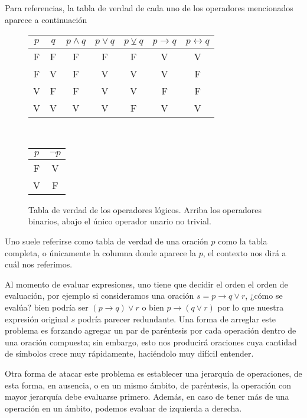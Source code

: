 \documentclass{book}
\theoremstyle{definition}
\begin{document}
Para referencias, la tabla de verdad de cada uno de los operadores mencionados aparece a continuación
\begin{figure}[h]
\begin{center}\begin{tabular}{|c|c||c|c|c|c|c|}
	\hline 
	$p$& $q$ & $p \wedge q $ & $p \vee q$  & $p \veebar q $ & $p \rightarrow q$ & $p \leftrightarrow q$  \\
	\hline \hline
	F & F & F & F & F & V & V \\
	\hline
	F & V & F & V & V & V & F \\
	\hline
	V & F & F & V & V & F & F \\
	\hline
	V & V & V & V & F & V & V \\
	\hline
\end{tabular}\\
\begin{tabular}{|c||c|}
	\hline
	$p$ & $\neg p$ \\
	\hline \hline
	F & V \\
	\hline
	V & F \\
	\hline
\end{tabular}
\end{center}
\caption{Tabla de verdad de los operadores lógicos. Arriba los operadores binarios, abajo el único operador unario no trivial.}
\label{tb_tablaVerdadOperadores}
\end{figure}

Uno suele referirse como tabla de verdad de una oración $p$ como la tabla completa, o únicamente la columna donde aparece la $p$, el contexto nos dirá a cuál nos referimos.

Al momento de evaluar expresiones, uno tiene que decidir el orden el orden de evaluación, por ejemplo si consideramos una oración $s=p\rightarrow q \vee r$, ¿cómo se evalúa? bien podría ser $(p\rightarrow q) \vee r$ o bien $p\rightarrow (q \vee r)$ por lo que nuestra expresión original $s$ podría parecer redundante. Una forma de arreglar este problema es forzando agregar un par de paréntesis por cada operación dentro de una oración compuesta; sin embargo, esto nos producirá oraciones cuya cantidad de símbolos crece muy rápidamente, haciéndolo muy difícil entender.

Otra forma de atacar este problema es establecer una jerarquía de operaciones, de esta forma, en ausencia, o en un mismo ámbito, de paréntesis, la operación con mayor jerarquía debe evaluarse primero.
Además, en caso de tener más de una operación en un ámbito, podemos evaluar de izquierda a derecha.
\end{document}
